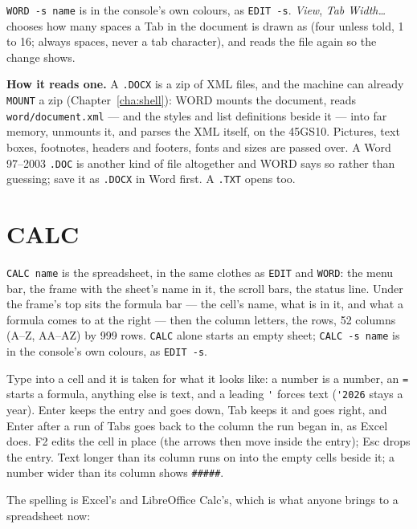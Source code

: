 \noindent \verb|WORD -s name| is in the console's own colours, as \verb|EDIT -s|. \emph{View}, \emph{Tab Width\ldots} chooses how many spaces a Tab in the document is drawn as (four unless told, 1 to 16; always spaces, never a tab character), and reads the file again so the change shows.

\textbf{How it reads one.} A \texttt{.DOCX} is a zip of XML files, and
the machine can already \verb|MOUNT| a zip (Chapter~\ref{cha:shell}): WORD
mounts the document, reads \texttt{word/document.xml} --- and the styles and
list definitions beside it --- into far memory, unmounts it, and parses the
XML itself, on the 45GS10. Pictures, text boxes, footnotes, headers and
footers, fonts and sizes are passed over. A Word 97--2003 \texttt{.DOC} is
another kind of file altogether and WORD says so rather than guessing; save
it as \texttt{.DOCX} in Word first. A \texttt{.TXT} opens too.

\section{CALC}\label{sec:calc}
\verb|CALC name| is the spreadsheet, in the same clothes as \verb|EDIT| and
\verb|WORD|: the menu bar, the frame with the sheet's name in it, the scroll
bars, the status line. Under the frame's top sits the formula bar --- the
cell's name, what is in it, and what a formula comes to at the right --- then
the column letters, the rows, 52 columns (A--Z, AA--AZ) by 999 rows.
\verb|CALC| alone starts an empty sheet; \verb|CALC -s name| is in the
console's own colours, as \verb|EDIT -s|.

Type into a cell and it is taken for what it looks like: a number is a
number, an \verb|=| starts a formula, anything else is text, and a leading
\verb|'| forces text (\verb|'2026| stays a year). Enter keeps the entry and
goes down, Tab keeps it and goes right, and Enter after a run of Tabs goes
back to the column the run began in, as Excel does. F2 edits the cell in
place (the arrows then move inside the entry); Esc drops the entry. Text
longer than its column runs on into the empty cells beside it; a number
wider than its column shows \verb|#####|.

The spelling is Excel's and LibreOffice Calc's, which is what anyone brings
to a spreadsheet now:

